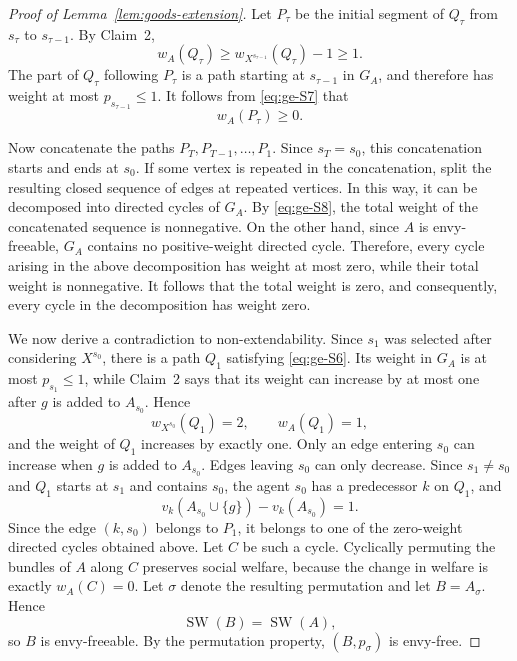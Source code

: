 \begin{proof}[Proof of Lemma~\ref{lem:goods-extension}]
Let $P_\tau$ be the initial segment of $Q_\tau$ from $s_\tau$ to $s_{\tau-1}$. By
Claim~2,
\begin{equation}\label{eq:ge-S7}
  w_A(Q_\tau)
  \geq
  w_{X^{s_{\tau-1}}}(Q_\tau)-1
  \geq1.
\end{equation}
The part of $Q_\tau$ following $P_\tau$ is a path starting at $s_{\tau-1}$ in
$G_A$, and therefore has weight at most $p_{s_{\tau-1}}\leq1$. It follows from
\eqref{eq:ge-S7} that
\begin{equation}\label{eq:ge-S8}
  w_A(P_\tau)\geq0.
\end{equation}

Now concatenate the paths $P_T,P_{T-1},\ldots,P_1$. Since $s_T=s_0$, this
concatenation starts and ends at $s_0$. If some vertex is repeated in the
concatenation, split the resulting closed sequence of edges at repeated vertices.
In this way, it can be decomposed into directed cycles of $G_A$. By
\eqref{eq:ge-S8}, the total weight of the concatenated sequence is nonnegative.
On the other hand, since $A$ is envy-freeable, $G_A$ contains no positive-weight
directed cycle. Therefore, every cycle arising in the above decomposition has
weight at most zero, while their total weight is nonnegative. It follows that the
total weight is zero, and consequently, every cycle in the decomposition has
weight zero.

We now derive a contradiction to non-extendability. Since $s_1$ was selected
after considering $X^{s_0}$, there is a path $Q_1$ satisfying \eqref{eq:ge-S6}.
Its weight in $G_A$ is at most $p_{s_1}\leq1$, while Claim~2 says that its weight
can increase by at most one after $g$ is added to $A_{s_0}$. Hence
\[
  w_{X^{s_0}}(Q_1)=2,
  \qquad
  w_A(Q_1)=1,
\]
and the weight of $Q_1$ increases by exactly one. Only an edge entering $s_0$ can
increase when $g$ is added to $A_{s_0}$. Edges leaving $s_0$ can only decrease.
Since $s_1\neq s_0$ and $Q_1$ starts at $s_1$ and contains $s_0$, the agent $s_0$
has a predecessor $k$ on $Q_1$, and
\begin{equation}\label{eq:ge-S9}
  v_k(A_{s_0}\cup\{g\})-v_k(A_{s_0})=1.
\end{equation}
Since the edge $(k,s_0)$ belongs to $P_1$, it belongs to one of the zero-weight
directed cycles obtained above. Let $C$ be such a cycle. Cyclically permuting the
bundles of $A$ along $C$ preserves social welfare, because the change in welfare
is exactly $w_A(C)=0$. Let $\sigma$ denote the resulting permutation and let
$B=A_\sigma$. Hence
\[
  \operatorname{SW}(B)=\operatorname{SW}(A),
\]
so $B$ is envy-freeable. By the permutation property, $(B,p_\sigma)$ is
envy-free.


\end{proof}
